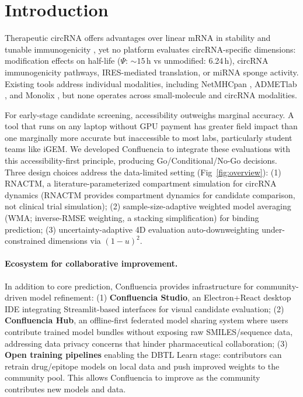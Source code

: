 
\section{Introduction}

Therapeutic circRNA offers advantages over linear mRNA in stability and tunable immunogenicity \citep{wesselhoeft2018,chen2019}, yet no platform evaluates circRNA-specific dimensions: modification effects on half-life ($\Psi$: ${\sim}15$\,h vs unmodified: 6.24\,h), circRNA immunogenicity pathways, IRES-mediated translation, or miRNA sponge activity. Existing tools address individual modalities, including NetMHCpan \citep{reynisson2020}, ADMETlab \citep{xiong2024}, and Monolix \citep{dumont2014}, but none operates across small-molecule and circRNA modalities.

For early-stage candidate screening, accessibility outweighs marginal accuracy. A tool that runs on any laptop without GPU payment has greater field impact than one marginally more accurate but inaccessible to most labs, particularly student teams like iGEM. We developed Confluencia to integrate these evaluations with this accessibility-first principle, producing Go/Conditional/No-Go decisions. Three design choices address the data-limited setting (Fig~\ref{fig:overview}): (1) RNACTM, a literature-parameterized compartment simulation for circRNA dynamics (RNACTM provides compartment dynamics for candidate comparison, not clinical trial simulation); (2) sample-size-adaptive weighted model averaging (WMA; inverse-RMSE weighting, a stacking simplification) for binding prediction; (3) uncertainty-adaptive 4D evaluation auto-downweighting under-constrained dimensions via $(1{-}u)^2$.

\paragraph{Ecosystem for collaborative improvement.}
In addition to core prediction, Confluencia provides infrastructure for community-driven model refinement: (1) \textbf{Confluencia Studio}, an Electron+React desktop IDE integrating Streamlit-based interfaces for visual candidate evaluation; (2) \textbf{Confluencia Hub}, an offline-first federated model sharing system where users contribute trained model bundles without exposing raw SMILES/sequence data, addressing data privacy concerns that hinder pharmaceutical collaboration; (3) \textbf{Open training pipelines} enabling the DBTL Learn stage: contributors can retrain drug/epitope models on local data and push improved weights to the community pool. This allows Confluencia to improve as the community contributes new models and data.